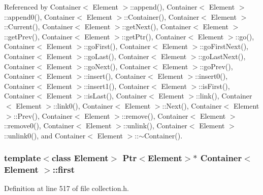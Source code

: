 Referenced by Container$<$ Element $>$::append(), Container$<$ Element $>$::append0(), Container$<$ Element $>$::Container(), Container$<$ Element $>$::Current(), Container$<$ Element $>$::getNext(), Container$<$ Element $>$::getPrev(), Container$<$ Element $>$::getPtr(), Container$<$ Element $>$::go(), Container$<$ Element $>$::goFirst(), Container$<$ Element $>$::goFirstNext(), Container$<$ Element $>$::goLast(), Container$<$ Element $>$::goLastNext(), Container$<$ Element $>$::goNext(), Container$<$ Element $>$::goPrev(), Container$<$ Element $>$::insert(), Container$<$ Element $>$::insert0(), Container$<$ Element $>$::insert1(), Container$<$ Element $>$::isFirst(), Container$<$ Element $>$::isLast(), Container$<$ Element $>$::link(), Container$<$ Element $>$::link0(), Container$<$ Element $>$::Next(), Container$<$ Element $>$::Prev(), Container$<$ Element $>$::remove(), Container$<$ Element $>$::remove0(), Container$<$ Element $>$::unlink(), Container$<$ Element $>$::unlink0(), and Container$<$ Element $>$::$\sim$Container().\hypertarget{classContainer_1b3e7c09fde6b124308eb6c47601e9d3}{
\subsubsection[{first}]{\setlength{\rightskip}{0pt plus 5cm}template$<$class Element$>$ {\bf Ptr}$<$Element$>$$\ast$ {\bf Container}$<$ Element $>$::{\bf first}}}
\label{classContainer_1b3e7c09fde6b124308eb6c47601e9d3}




Definition at line 517 of file collection.h.

